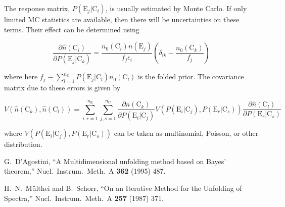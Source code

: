 \documentclass[12pt,a4paper]{article}
\newcommand{\E}{\mathrm{E}}
\newcommand{\C}{\mathrm{C}}
\newcommand{\dd}[2]{\frac{\partial{#1}}{\partial{#2}}}
\begin{document}
The response matrix, $P(\E_j|\C_i)$, is usually estimated by Monte Carlo. If only limited MC statistics
are available, then there will be uncertainties on these terms. Their effect can be determined using

\begin{equation}
\dd{\hat{n}(\C_i)}{P(\E_j|\C_k)} = \frac{n_0(\C_i) n(\E_j)}{f_j \epsilon_i} \left( \delta_{ik} - \frac{n_0(\C_k)}{f_j} \right)
\end{equation}

where here $f_j \equiv \sum_{l=1}^{n_{\C}} P(\E_j|\C_l) n_0(\C_l)$ is the folded prior. The covariance matrix due to these errors is
given by

\begin{equation}
V(\hat{n}(\C_k),\hat{n}(\C_l)) = \sum_{i,r=1}^{n_{\E}} \sum_{j,s=1}^{n_{\C}} \dd{\hat{n}(\C_k)}{P(\E_i|\C_j)} V(P(\E_i|\C_j),P(\E_r|\C_s)) \dd{\hat{n}(\C_l)}{P(\E_r|\C_s)}
\end{equation}

where $V(P(\E_i|\C_j),P(\E_r|\C_s))$ can be taken as multinomial, Poisson, or other distribution.

\begin{thebibliography}{99}

  G.~D'Agostini,
  ``A Multidimensional unfolding method based on Bayes' theorem,''
  Nucl.\ Instrum.\ Meth.\  A {\bf 362} (1995) 487.

  H.~N.~M\"ulthei and B.~Schorr,
  ``On an Iterative Method for the Unfolding of Spectra,''
  Nucl.\ Instrum.\ Meth.\  A {\bf 257} (1987) 371.

\end{thebibliography}
\end{document}
